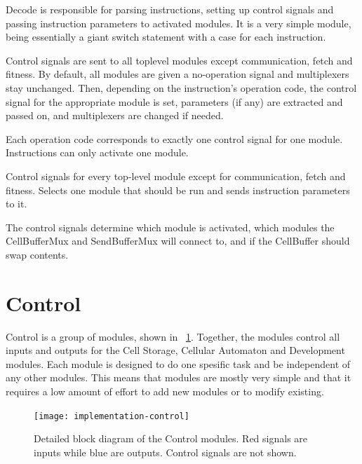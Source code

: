 Decode is responsible for parsing instructions, setting up control signals and passing instruction parameters to activated modules.
It is a very simple module, being essentially a giant switch statement with a case for each instruction.

Control signals are sent to all toplevel modules except communication, fetch and fitness.
By default, all modules are given a no-operation signal and multiplexers stay unchanged.
Then, depending on the instruction's operation code, the control signal for the appropriate module is set, parameters (if any) are extracted and passed on, and multiplexers are changed if needed.

Each operation code corresponds to exactly one control signal for one module.
Instructions can only activate one module.

Control signals for every top-level module except for communication, fetch and fitness.
Selects one module that should be run and sends instruction parameters to it.

The control signals determine which module is activated, which modules the CellBufferMux and SendBufferMux will connect to, and if the CellBuffer should swap contents.



\section{Control}

Control is a group of modules, shown in \figurename~\ref{fig:implementation-control}.
Together, the modules control all inputs and outputs for the Cell Storage, Cellular Automaton and Development modules.
Each module is designed to do one spesific task and be independent of any other modules.
This means that modules are mostly very simple and that it requires a low amount of effort to add new modules or to modify existing.

\begin{figure}[!ht]
    \centering
    \texttt{[image: implementation-control]}
    \caption[Control modules]{
        Detailed block diagram of the Control modules.
        Red signals are inputs while blue are outputs.
        Control signals are not shown.
    }
    \label{fig:implementation-control}
\end{figure}

